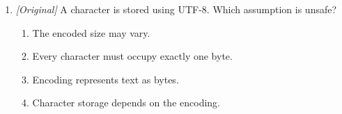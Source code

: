 \documentclass[11pt]{article}
\begin{document}
\begin{enumerate}[label=\textbf{Q\arabic*.}, leftmargin=*]
\begin{enumerate}[label=\Alph*.]
      ladder uses powers of 1024.
    \item Bytes have different sizes in every file.
    \item A bit is sometimes 4 bytes.
    \item Capacity always depends on network speed.
  \end{enumerate}
\item \textit{[Original]} A character is stored using UTF-8. Which assumption
  is unsafe?
  \begin{enumerate}[label=\Alph*.]
    \item The encoded size may vary.
    \item Every character must occupy exactly one byte.
    \item Encoding represents text as bytes.
    \item Character storage depends on the encoding.
  \end{enumerate}


\end{enumerate}
\end{document}
